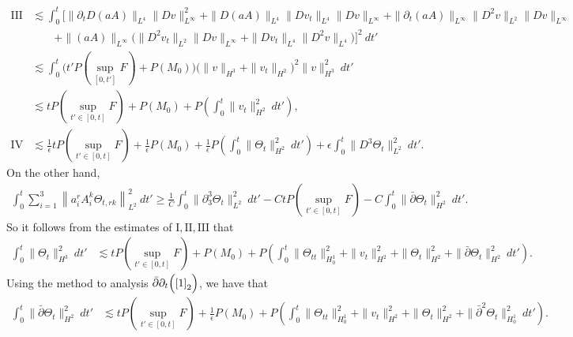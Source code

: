 \documentclass[12pt,a4paper]{amsart}
\numberwithin{equation}{section}
\theoremstyle{plain}
\theoremstyle{definition}
\newcommand{\bpartial}{\bar{\partial}}
\begin{document}
\begin{align*}
\mathrm{III}&\lesssim \int_{0}^{t}  \Big[
      \|\partial_t D(aA)\|_{L^4} \|Dv\|_{L^{\infty}}^2
     +\| D (aA)\|_{L^4}  \|D v_t\|_{L^4}\|Dv\|_{L^{\infty}}
     + \| \partial_t (aA)\|_{L^{\infty}}  \|D^2 v\|_{L^2}\|Dv\|_{L^{\infty}}\\
         &\qquad
     +\|(aA)\|_{L^{\infty}}\Big( \|D^2 v_t\|_{L^2}\|Dv\|_{L^{\infty}}+\|D v_t\|_{L^4}\|D^2v\|_{L^4}\Big)\Big]^2 \ dt'\\
&\lesssim  \int_{0}^{t} \Big( t'P(\sup\limits_{[0,t']}F)+P(M_0)  \Big)
      \Big(\|v\|_{H^3}+\|v_t\|_{H^2}\Big)^2 \|v\|_{H^3}^2 \ dt'\\
&\lesssim tP(\sup\limits_{t'\in[0,t]}F)+P(M_0)
     +P\left(\int_{0}^{t}\|v_t\|_{H^2}^2 \ dt'\right),\\
\mathrm{IV}
&\lesssim  \frac{1}{\epsilon}tP(\sup\limits_{t'\in[0,t]}F)+\frac{1}{\epsilon}P(M_0)+\frac{1}{\epsilon}P\left(\int_{0}^{t}\|\Theta_t\|_{H^2}^2 \ dt'\right)+\epsilon \int_{0}^{t}\|D^3\Theta_t\|_{L^2}^2 \ dt'.
\end{align*}
On the other hand, 
\begin{align*}
\int_{0}^{t}\sum\limits_{i=1}^3\left\|a^r_iA^k_i\Theta_{t,rk} \right\|_{L^2}^2 \ dt'
\geq  \frac{1}{C}\int_{0}^{t}\|\partial_3^3 \Theta_t\|_{L^2}^2 \ dt'-CtP(\sup\limits_{t'\in[0,t]}F)-C\int_{0}^{t} \|\bpartial \Theta_t\|_{H^2}^2 \ dt'.
\end{align*}
So it follows from the estimates of $\mathrm{I},\mathrm{II},\mathrm{III}$ that
\begin{equation}
\label{dthetatxx2}
\begin{aligned}
\int_{0}^{t}\| \Theta_t\|_{H^3}^2 \ dt' &\lesssim tP(\sup\limits_{t'\in[0,t]}F)+P(M_0)+P\left(\int_{0}^{t}\|\Theta_{tt}\|_{H_0^1}^2+\|v_t\|_{H^2}^2+\|\Theta_t\|_{H^2}^2 +\|\bpartial \Theta_t\|_{H^2}^2\ dt'\right).
\end{aligned}
\end{equation}
Using the method to analysis $\bpartial\partial_t  \Big(\eqref{1}_2\Big)$, we have that
\begin{equation}
\label{dthetatxx1}
\begin{aligned}
\int_{0}^{t}\| \bpartial \Theta_t\|_{H^2}^2 \ dt' &\lesssim tP(\sup\limits_{t'\in[0,t]}F)+\frac{1}{\epsilon}P(M_0)+P\left(\int_{0}^{t}\|\Theta_{tt}\|_{H_0^1}^2+\|v_t\|_{H^2}^2+\|\Theta_t\|_{H^2}^2 +\|\bpartial^2 \Theta_t\|_{H_0^1}^2\ dt' \right).
\end{aligned}
\end{equation}
\end{document}
